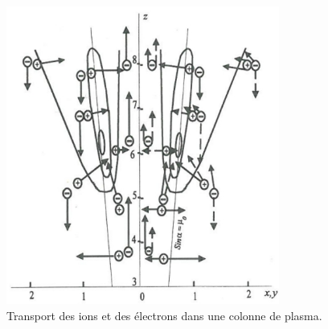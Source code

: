 \begin{refsection}
\begin{figure}[htbp]
\centering
\includegraphics[width=0.8\textwidth]{figures/4-magnetizedColumn.jpg}
{\caption{Transport des ions et des électrons dans une colonne de
plasma\parencite{Rozhansky}.}
\label{1-magnetizedColumn}}
\end{figure}

%
%
\end{refsection}

